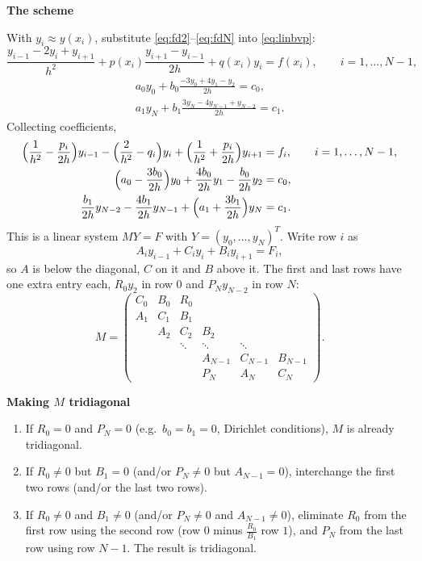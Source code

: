 \documentclass[11pt,a4paper]{article}
\numberwithin{equation}{section}
\theoremstyle{spacedplain}
\theoremstyle{spaceddefinition}
\theoremstyle{spacedremark}
\newcommand{\step}[1]{\par\addvspace{0.6em}\noindent\textbf{#1}\par\nobreak}
\begin{document}
\step{The scheme}
With \(y_i\approx y(x_i)\), substitute
\eqref{eq:fd2}--\eqref{eq:fdN} into \eqref{eq:linbvp}:
\[
  \frac{y_{i-1}-2y_i+y_{i+1}}{h^2}
  +p(x_i)\frac{y_{i+1}-y_{i-1}}{2h}+q(x_i)y_i=f(x_i),
  \qquad i=1,\dots,N-1,
\]
\[
\begin{gathered}
  a_0y_0+b_0\frac{-3y_0+4y_1-y_2}{2h}=c_0,
  \\
  a_1y_N+b_1\frac{3y_N-4y_{N-1}+y_{N-2}}{2h}=c_1.
\end{gathered}
\]
Collecting coefficients,
\begin{align*}
  \Bigl(\frac1{h^2}-\frac{p_i}{2h}\Bigr)y_{i-1}
  -\Bigl(\frac2{h^2}-q_i\Bigr)y_i
  +\Bigl(\frac1{h^2}+\frac{p_i}{2h}\Bigr)y_{i+1}
  &=f_i,\qquad i=1,\dots,N-1,\\
  \Bigl(a_0-\frac{3b_0}{2h}\Bigr)y_0+\frac{4b_0}{2h}y_1
  -\frac{b_0}{2h}y_2&=c_0,\\
  \frac{b_1}{2h}y_{N-2}-\frac{4b_1}{2h}y_{N-1}
  +\Bigl(a_1+\frac{3b_1}{2h}\Bigr)y_N&=c_1.
\end{align*}
This is a linear system \(MY=F\) with \(Y=(y_0,\dots,y_N)^T\).  Write
row \(i\) as
\[
  A_iy_{i-1}+C_iy_i+B_iy_{i+1}=F_i,
\]
so \(A\) is below the diagonal, \(C\) on it and \(B\) above it.  The
first and last rows have one extra entry each, \(R_0y_2\) in row \(0\)
and \(P_Ny_{N-2}\) in row \(N\):
\[
  M=\begin{pmatrix}
    C_0&B_0&R_0&&&\\
    A_1&C_1&B_1&&&\\
    &A_2&C_2&B_2&&\\
    &&\ddots&\ddots&\ddots&\\
    &&&A_{N-1}&C_{N-1}&B_{N-1}\\
    &&&P_N&A_N&C_N
  \end{pmatrix}.
\]

\step{Making \(M\) tridiagonal}

\begin{enumerate}
  \item If \(R_0=0\) and \(P_N=0\) (e.g.\ \(b_0=b_1=0\), Dirichlet
    conditions), \(M\) is already tridiagonal.
  \item If \(R_0\ne0\) but \(B_1=0\) (and/or \(P_N\ne0\) but
    \(A_{N-1}=0\)), interchange the first two rows (and/or the last two
    rows).
  \item If \(R_0\ne0\) and \(B_1\ne0\) (and/or \(P_N\ne0\) and
    \(A_{N-1}\neq0\)), eliminate \(R_0\) from the first row using the
    second row (row \(0\) minus \(\frac{R_0}{B_1}\) row \(1\)), and
    \(P_N\) from the last row using row \(N-1\).  The result is
    tridiagonal.
\end{enumerate}
\end{document}
